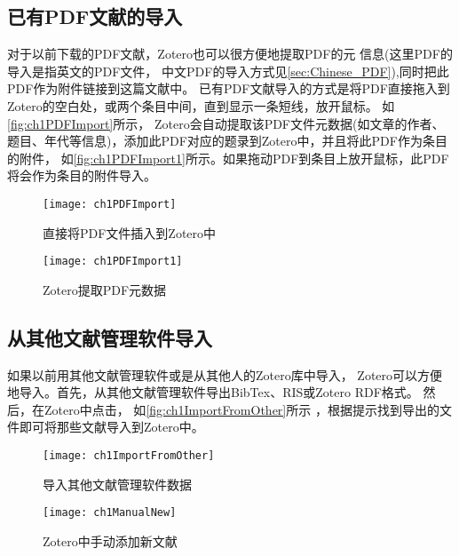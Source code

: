 \documentclass[theorem=false,mathfont=none,openany,sub3section]{easybook}
\begin{document}
\subsection{已有PDF文献的导入} \label{sec:EngPDFIm}
对于以前下载的PDF文献，Zotero也可以很方便地提取PDF的元
信息(这里PDF的导入是指英文的PDF文件，
中文PDF的导入方式见\cref{sec:Chinese_PDF}),同时把此PDF作为附件链接到这篇文献中。
已有PDF文献导入的方式是将PDF直接拖入到Zotero的空白处，或两个条目中间，直到显示一条短线，放开鼠标。
如\autoref{fig:ch1PDFImport}所示，
Zotero会自动提取该PDF文件元数据(如文章的作者、题目、年代等信息)，添加此PDF对应的题录到Zotero中，并且将此PDF作为条目的附件，
如\autoref{fig:ch1PDFImport1}所示。如果拖动PDF到条目上放开鼠标，此PDF将会作为条目的附件导入。
\begin{figure}[htbp]
	\centering
	\texttt{[image: ch1PDFImport]}
	\caption{直接将PDF文件插入到Zotero中}
	\label{fig:ch1PDFImport}
\end{figure}
\begin{figure}[htbp]
	\centering
	\texttt{[image: ch1PDFImport1]}
	\caption{Zotero提取PDF元数据}
	\label{fig:ch1PDFImport1}
\end{figure}

\subsection{从其他文献管理软件导入}\label{OtherRefSoft}
如果以前用其他文献管理软件或是从其他人的Zotero库中导入，
Zotero可以方便地导入。首先，从其他文献管理软件导出BibTex、RIS或Zotero RDF格式。
然后，在Zotero中点击，
如\autoref{fig:ch1ImportFromOther}所示
，根据提示找到导出的文件即可将那些文献导入到Zotero中。
\begin{figure}
	\centering
	\begin{minipage}[t]{\dimexpr0.5\textwidth-4em}
		\centering
		\texttt{[image: ch1ImportFromOther]}
		\caption{导入其他文献管理软件数据}
		\label{fig:ch1ImportFromOther}
	\end{minipage}	
	\hspace{2cm}
	\begin{minipage}[t]{\dimexpr0.5\textwidth-4em}
		\centering
		\texttt{[image: ch1ManualNew]}
		\caption{Zotero中手动添加新文献}
		\label{fig:ch1ManualNew}
	\end{minipage}	
\end{figure}
\end{document}
